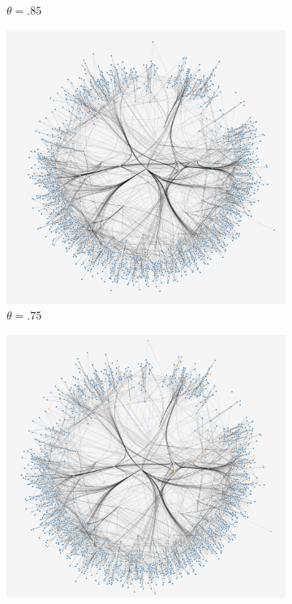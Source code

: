 \begin{figure}[H]
\begin{subfigure}[b]{.49\textwidth}
     \caption{$\theta = .85$}
     \end{subfigure}
\begin{subfigure}[b]{.49\textwidth}
         \centering
     \includegraphics[width=\textwidth]{figures_c1/layout/merc3.png}
     \caption{$\theta = .75$}
     \end{subfigure}
 \begin{subfigure}[b]{.49\textwidth}
     \centering
 \includegraphics[width=\textwidth]{figures_c1/layout/merc4.png}

\end{subfigure}
\end{figure}
